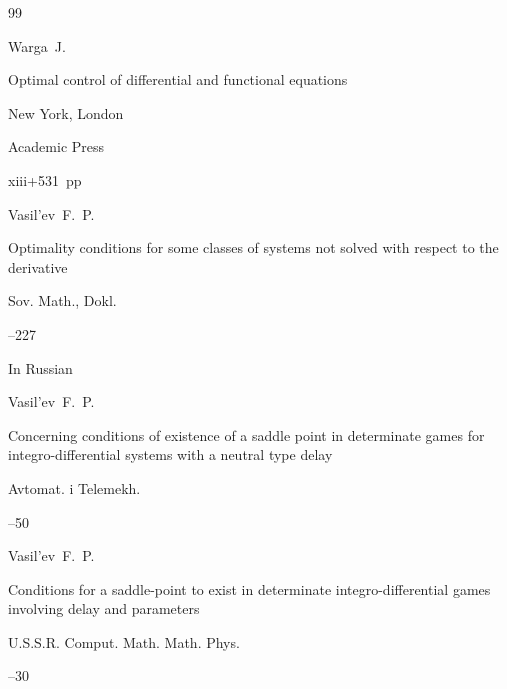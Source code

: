 \begin{thebibliography}{99}






\by Warga~J.

\book Optimal control of differential and functional equations


\publaddr New York, London

\publ Academic Press


\totalpages xiii+531~pp \nofrills





\by Vasil'ev~F.~P.

\paper Optimality conditions for some classes of systems not solved with respect to the derivative

\jour Sov. Math., Dokl. 


--227 






\lang In Russian

\by Vasil'ev~F.~P. 

\paper Concerning conditions of existence of a saddle point in determinate games for integro-differential systems with a neutral type delay

\jour Avtomat. i Telemekh.



--50






\by Vasil'ev~F.~P.

\paper Conditions for a saddle-point to exist in determinate integro-differential games involving delay and parameters

\jour U.S.S.R. Comput. Math. Math. Phys.




--30


\end{thebibliography}
